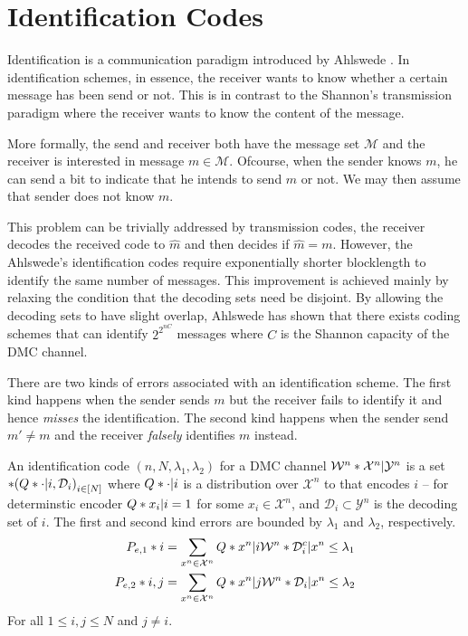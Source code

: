 \section{Identification Codes}
Identification is a communication paradigm introduced by Ahlswede \cite{idfeedback}. In identification schemes, in essence, the receiver wants to know whether a certain message has been send or not. This is in contrast to the Shannon's transmission paradigm where the receiver wants to know the content of the message. 

More formally, the send and receiver both have the message set \(\mathcal{M}\) and the receiver is interested in message \(m \in \mathcal{M}\). Ofcourse, when the sender knows \(m\), he can send a bit to indicate that he intends to send \(m\) or not. We may then assume that sender does not know \(m\). 

This problem can be trivially addressed by transmission codes, the receiver decodes the received code to \(\hat{m}\) and then decides if \(\hat{m} = m\). However, the  Ahlswede's identification codes require exponentially shorter blocklength to identify the same number of messages. This improvement is achieved mainly by relaxing the condition that the decoding sets need be disjoint. By allowing the decoding sets to have slight overlap, Ahlswede \cite{idfeedback} has shown that there exists coding schemes that can identify \(2^{2^{nC}}\) messages where \(C\) is the Shannon capacity of the DMC channel.

There are two kinds of errors associated with an identification scheme. The first kind happens when the sender sends \(m\) but the receiver fails to identify it and hence \textit{misses} the identification. The second kind happens when the sender send \(m' \neq m\) and the receiver \textit{falsely} identifies \(m\) instead.

\begin{definition}\label{def:idcode}
	An identification code \((n, N,\lambda_1, \lambda_2)\) for a DMC channel \(\func{\mathcal{W}^n}{\mathcal{X}^n | \mathcal{Y}^n}\) is a set \(\set{ (\func{Q}{ \cdot |i} ,\mathcal{D}_i)}_{i \in [N]}\) where \(\func{Q}{ \cdot |i}\) is a distribution over \(\mathcal{X}^n\) to that encodes \(i\) -- for determinstic encoder \(\func{Q}{ x_i |i} = 1\) for some \(x_i \in \mathcal{X}^n\), and \(\mathcal{D}_i \subset \mathcal{Y}^n\) is the decoding set of \(i\). The first and second kind errors are bounded by \(\lambda_1\) and \(\lambda_2\), respectively.
	\begin{align*}
		\func{P_{e,1}}{i} &= \sum_{x^n \in \mathcal{X}^n} \func{Q}{ x^n |i} \func{\mathcal{W}^n}{\mathcal{D}_i^c | x^n} \leq \lambda_1 \\
		\func{P_{e,2}}{i,j}&=\sum_{x^n \in \mathcal{X}^n} \func{Q}{ x^n |j} \func{\mathcal{W}^n}{\mathcal{D}_i | x^n} \leq \lambda_2
	\end{align*}
	For all \(1 \leq i,j \leq N\) and \(j \neq i\).
\end{definition}

